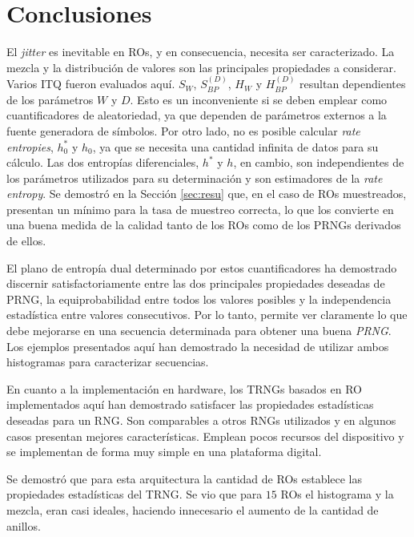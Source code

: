 \section{Conclusiones}

El \textit{jitter} es inevitable en {RO}s, y en consecuencia, necesita ser caracterizado.
La mezcla y la distribución de valores son las principales propiedades a considerar.
Varios {ITQ} fueron evaluados aquí.
$S_W$, $S^{(D)}_{BP}$, $H_W$ y $H^{(D)}_{BP}$ resultan dependientes de los parámetros $W$ y $D$.
Esto es un inconveniente si se deben emplear como cuantificadores de aleatoriedad, ya que dependen de parámetros externos a la fuente generadora de símbolos.
Por otro lado, no es posible calcular \emph{rate entropies}, $h_0^*$ y $h_0$, ya que se necesita una cantidad infinita de datos para su cálculo.
Las dos {entropías diferenciales}, $h^*$ y $h$, en cambio, son independientes de los parámetros utilizados para su determinación y son estimadores de la \emph{rate entropy}.
Se demostró en la Sección \ref{sec:resu} que, en el caso de {RO}s muestreados, presentan un mínimo para la tasa de muestreo correcta, lo que los convierte en una buena medida de la calidad tanto de los {RO}s como de los {PRNG}s derivados de ellos.

El plano de entropía dual determinado por estos cuantificadores ha demostrado discernir satisfactoriamente entre las dos principales propiedades deseadas de {PRNG}, la equiprobabilidad entre todos los valores posibles y la independencia estadística entre valores consecutivos.
Por lo tanto, permite ver claramente lo que debe mejorarse en una secuencia determinada para obtener una buena \textit{PRNG}.
Los ejemplos presentados aquí han demostrado la necesidad de utilizar ambos histogramas para caracterizar secuencias.

En cuanto a la implementación en hardware, los {TRNG}s basados en {RO} implementados aquí han demostrado satisfacer las propiedades estadísticas deseadas para un {RNG}.
Son comparables a otros {RNG}s utilizados y en algunos casos presentan mejores características.
Emplean pocos recursos del dispositivo y se implementan de forma muy simple en una plataforma digital.

Se demostró que para esta arquitectura la cantidad de {RO}s establece las propiedades estadísticas del {TRNG}.
Se vio que para $15$ {RO}s el histograma y la mezcla, eran casi ideales, haciendo innecesario el aumento de la cantidad de anillos.